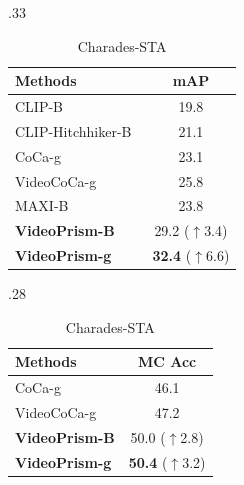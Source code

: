 \documentclass{article}
\theoremstyle{plain}
\theoremstyle{definition}
\theoremstyle{remark}
\newcommand{\OURS}{VideoPrism\xspace}
\newcommand{\upcolor}[1]{\textcolor{vpblue}{($\uparrow$#1)}}
\begin{document}
\begin{table}[t]
\begin{subtable}[t]{.33\linewidth}
    \begin{center}
    \caption{Charades}
    \setlength{\tabcolsep}{4pt}
    \vspace{-0.3\baselineskip}
    \begin{scriptsize}
    \begin{tabular}{@{}lc@{}}
    	\toprule
    	Methods & mAP \\
    	\midrule
    	CLIP-B~\cite{radford2021learning} & 19.8 \\
    	CLIP-Hitchhiker-B~\cite{bain2022clip} & 21.1 \\
    	CoCa-g~\cite{yu2022coca} & 23.1 \\
    	VideoCoCa-g~\cite{yan2022videococa} & 25.8 \\
    	MAXI-B~\cite{lin2023match} & 23.8 \\
    	\textbf{\OURS-B} & 29.2 \upcolor{3.4} \\
    	\textbf{\OURS-g} & \textbf{32.4} \upcolor{6.6} \\
    	\bottomrule
    \end{tabular}
    \end{scriptsize}
    \label{tbl:zs_cls:ch}
    \end{center}
\end{subtable}
\begin{subtable}[t]{.28\linewidth}
    \begin{center}
    \caption{Charades-STA}
    \vspace{-0.3\baselineskip}
    \setlength{\tabcolsep}{4pt}
    \begin{scriptsize}
    \begin{tabular}{@{}lc@{}}
        \toprule Methods & MC Acc \\ 
      	\midrule
      	CoCa-g~\cite{yu2022coca} & 46.1 \\
    	VideoCoCa-g~\cite{yan2022videococa} & 47.2 \\
      	\textbf{\OURS-B} & 50.0 \upcolor{2.8} \\
    	\textbf{\OURS-g} & \textbf{50.4} \upcolor{3.2} \\
      	\bottomrule
    \end{tabular}
    \end{scriptsize}
    \label{tbl:zs_cls:chsta}
    \end{center}
\end{subtable}
\label{tbl:zs_cls}
\end{table}
\end{document}
